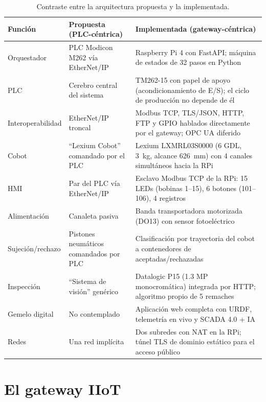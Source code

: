 \documentclass{styles/svproc}
\begin{document}
\begin{table}[t]
  \caption{Contraste entre la arquitectura propuesta y la implementada.}
  \label{tab:comparativa}
  \centering
  \scriptsize
  \begin{tabular}{@{}p{}p{}p{}@{}}
    \toprule
    Función & Propuesta (PLC-céntrica) & Implementada (gateway-céntrica) \\
    \midrule
    Orquestador & PLC Modicon M262 vía EtherNet/IP & Raspberry Pi 4 con FastAPI; máquina de estados de 32 pasos en Python \\
    PLC & Cerebro central del sistema & TM262-15 con papel de apoyo (acondicionamiento de E/S); el ciclo de producción no depende de él \\
    Interoperabilidad & EtherNet/IP troncal & Modbus TCP, TLS/JSON, HTTP, FTP y GPIO hablados directamente por el gateway; OPC UA diferido \\
    Cobot & ``Lexium Cobot'' comandado por el PLC & Lexium LXMRL03S0000 (6 GDL, \SI{3}{\kilo\gram}, alcance \SI{626}{\milli\metre}) con 4 canales simultáneos hacia la RPi \\
    HMI & Par del PLC vía EtherNet/IP & Esclavo Modbus TCP de la RPi: 15 LEDs (bobinas 1--15), 6 botones (101--106), 4 registros \\
    Alimentación & Canaleta pasiva & Banda transportadora motorizada (DO13) con sensor fotoeléctrico \\
    Sujeción/rechazo & Pistones neumáticos comandados por PLC & Clasificación por trayectoria del cobot a contenedores de aceptadas/rechazadas \\
    Inspección & ``Sistema de visión'' genérico & Datalogic P15 (1.3 MP monocromática) integrada por HTTP; algoritmo propio de 5 remaches \\
    Gemelo digital & No contemplado & Aplicación web completa con URDF, telemetría en vivo y SCADA 4.0 + IA \\
    Redes & Una red implícita & Dos subredes con NAT en la RPi; túnel TLS de dominio estático para el acceso público \\
    \bottomrule
  \end{tabular}
\end{table}

\section{El gateway IIoT}
\end{document}
